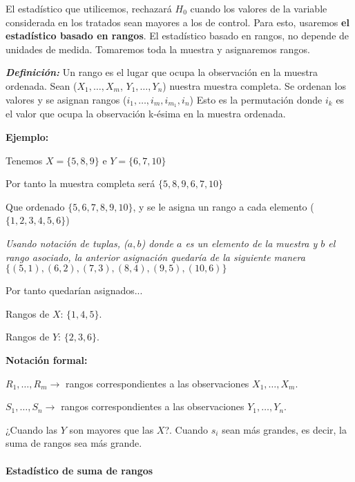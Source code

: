 El estadístico que utilicemos, rechazará $H_0$ cuando los valores de la variable considerada en los tratados sean mayores a los de control.
Para esto, usaremos \textbf{el estadístico basado en rangos}.
El estadístico basado en rangos, no depende de unidades de medida. Tomaremos toda la muestra y asignaremos rangos.

\textbf{\textit{Definición:}} Un rango es el lugar que ocupa la observación en la muestra ordenada.
Sean ($X_1,\dots,X_m$, $Y_1,\dots,Y_n$) nuestra muestra completa. Se ordenan los valores y se asignan rangos ($i_1,\dots,i_m,i_{m_1},i_n$)
Esto es la permutación donde $i_k$ es el valor que ocupa la observación k-ésima en la muestra ordenada.

\textbf{Ejemplo:}

Tenemos $X=\{5,8,9\}$ e $Y=\{6,7,10\}$

Por tanto la muestra completa será $\{5,8,9,6,7,10\}$

Que ordenado $\{5,6,7,8,9,10\}$, y se le asigna un rango a cada elemento ($\{1,2,3,4,5,6\}$)

\vspace{2mm}

\noindent \textit{Usando notación de tuplas, ($a, b$) donde $a$ es un elemento de la muestra y $b$ el rango asociado, la anterior asignación quedaría de la siguiente manera $\{(5, 1),(6, 2),(7, 3),(8, 4),(9, 5),(10, 6)\}$}

\vspace{2mm}

\noindent Por tanto quedarían asignados...

Rangos de $X$: $\{1,4,5\}$.

Rangos de $Y$: $\{2,3,6\}$.

\vspace{5mm}

\noindent \textbf{Notación formal:}

$R_1,\dots,R_m \longrightarrow$ rangos correspondientes a las observaciones $X_1,\dots,X_m$.

$S_1,\dots,S_n \longrightarrow$ rangos correspondientes a las observaciones $Y_1,\dots,Y_n$.

¿Cuando las $Y$ son mayores que las $X$?. Cuando $s_i$ sean más grandes, es decir, la suma de rangos sea más grande.

\paragraph{Estadístico de suma de rangos}

